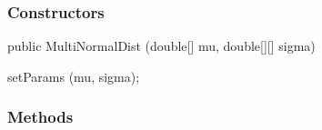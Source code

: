 \subsubsection* {Constructors}

\begin{code}

   public MultiNormalDist (double[] mu, double[][] sigma) \begin{hide} {
      setParams (mu, sigma);
   }\end{hide}
\end{code}

\subsubsection* {Methods}

